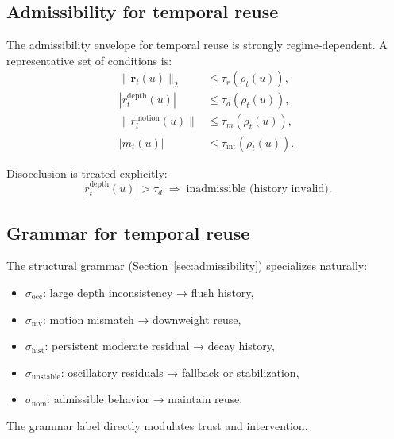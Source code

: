 \documentclass[11pt]{article}
\theoremstyle{definition}
\theoremstyle{plain}
\begin{document}

\subsection{Admissibility for temporal reuse}

The admissibility envelope for temporal reuse is strongly regime-dependent. A representative set of conditions is:
\begin{align}
\|\tilde{\mathbf r}_t(u)\|_2 &\le \tau_r(\rho_t(u)),\\
|r^{\mathrm{depth}}_t(u)| &\le \tau_d(\rho_t(u)),\\
\|r^{\mathrm{motion}}_t(u)\| &\le \tau_m(\rho_t(u)),\\
|m_t(u)| &\le \tau_{\mathrm{int}}(\rho_t(u)).
\end{align}

Disocclusion is treated explicitly:
\begin{equation}
|r^{\mathrm{depth}}_t(u)| > \tau_d \;\Rightarrow\; \text{inadmissible (history invalid)}.
\end{equation}


\subsection{Grammar for temporal reuse}

The structural grammar (Section~\ref{sec:admissibility}) specializes naturally:

\begin{itemize}[leftmargin=1.5em]
    \item $\sigma_{\mathrm{occ}}$: large depth inconsistency → flush history,
    \item $\sigma_{\mathrm{mv}}$: motion mismatch → downweight reuse,
    \item $\sigma_{\mathrm{hist}}$: persistent moderate residual → decay history,
    \item $\sigma_{\mathrm{unstable}}$: oscillatory residuals → fallback or stabilization,
    \item $\sigma_{\mathrm{nom}}$: admissible behavior → maintain reuse.
\end{itemize}

The grammar label directly modulates trust and intervention.
\end{document}
